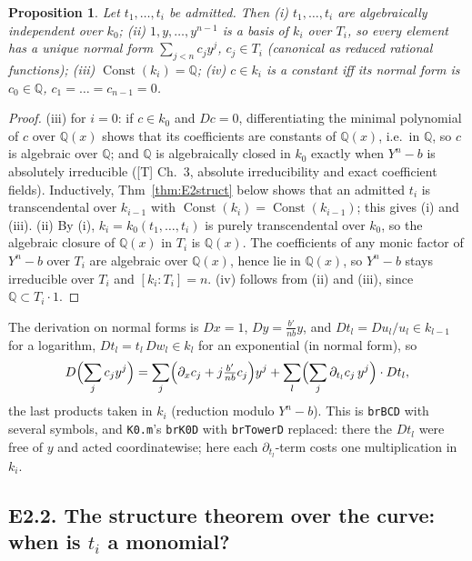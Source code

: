 \documentclass[11pt]{article}
\newtheorem{proposition}[theorem]{Proposition}
\theoremstyle{definition}
\theoremstyle{remark}
\newcommand{\Q}{\mathbb{Q}}
\newcommand{\code}[1]{\texttt{#1}}
\begin{document}
\begin{proposition}\label{prop:E2field}
Let $t_1,\dots,t_i$ be admitted. Then
(i) $t_1,\dots,t_i$ are algebraically independent over $k_0$;
(ii) $1,y,\dots,y^{n-1}$ is a basis of $k_i$ over $T_i$, so every element has a unique
normal form $\sum_{j<n}c_jy^j$, $c_j\in T_i$ (canonical as reduced rational functions);
(iii) $\operatorname{Const}(k_i)=\Q$;
(iv) $c\in k_i$ is a constant iff its normal form is $c_0\in\Q$, $c_1=\dots=c_{n-1}=0$.
\end{proposition}
\begin{proof}
(iii) for $i=0$: if $c\in k_0$ and $Dc=0$, differentiating the minimal polynomial of $c$
over $\Q(x)$ shows that its coefficients are constants of $\Q(x)$, i.e.\ in $\Q$, so $c$ is
algebraic over $\Q$; and $\Q$ is algebraically closed in $k_0$ exactly when $Y^n-b$ is
absolutely irreducible ([T] Ch.~3, absolute irreducibility and exact coefficient fields).
Inductively, Thm~\ref{thm:E2struct} below shows that an admitted $t_i$ is transcendental
over $k_{i-1}$ with $\operatorname{Const}(k_i)=\operatorname{Const}(k_{i-1})$; this gives
(i) and (iii). (ii) By (i), $k_i=k_0(t_1,\dots,t_i)$ is purely transcendental over $k_0$,
so the algebraic closure of $\Q(x)$ in $T_i$ is $\Q(x)$. The coefficients of any monic factor of $Y^n-b$ over $T_i$ are algebraic over
$\Q(x)$, hence lie in $\Q(x)$, so $Y^n-b$ stays irreducible over $T_i$ and
$[k_i:T_i]=n$. (iv) follows from (ii) and (iii), since $\Q\subset T_i\cdot1$.
\end{proof}

The derivation on normal forms is $Dx=1$, $Dy=\frac{b'}{nb}y$, and $Dt_l=Du_l/u_l\in k_{l-1}$
for a logarithm, $Dt_l=t_l\,Dw_l\in k_l$ for an exponential (in normal form), so
\[ D\Bigl(\sum_j c_jy^j\Bigr)=\sum_j\Bigl(\partial_xc_j+j\tfrac{b'}{nb}c_j\Bigr)y^j
   +\sum_l\Bigl(\sum_j\partial_{t_l}c_j\,y^j\Bigr)\cdot Dt_l , \]
the last products taken in $k_i$ (reduction modulo $Y^n-b$). This is \code{brBCD} with
several symbols, and \code{K0.m}'s \code{brK0D} with \code{brTowerD} replaced: there the
$Dt_l$ were free of $y$ and acted coordinatewise; here each $\partial_{t_l}$-term costs one
multiplication in $k_i$.

\subsection*{E2.2. The structure theorem over the curve: when is $t_i$ a monomial?}
\end{document}
